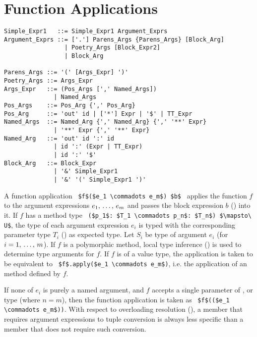\section{Function Applications}
\label{sec:function-applications}

\syntax\begin{lstlisting}[mathescape=false]
Simple_Expr1   ::= Simple_Expr1 Argument_Exprs 
Argument_Exprs ::= ['.'] Parens_Args {Parens_Args} [Block_Arg] 
                 | Poetry_Args [Block_Expr2]
                 | Block_Arg

Parens_Args ::= '(' [Args_Expr] ')'
Poetry_Args ::= Args_Expr
Args_Expr   ::= (Pos_Args [',' Named_Args])
              | Named_Args
Pos_Args    ::= Pos_Arg {',' Pos_Arg}
Pos_Arg     ::= 'out' id | ['*'] Expr | '$' | TT_Expr
Named_Args  ::= Named_Arg {',' Named_Arg} {',' '**' Expr}
              | '**' Expr {',' '**' Expr}
Named_Arg   ::= 'out' id ':' id
              | id ':' (Expr | TT_Expr)
              | id ':' '$'
Block_Arg   ::= Block_Expr 
              | '&' Simple_Expr1 
              | '&' '(' Simple_Expr1 ')'
\end{lstlisting}


A function application ~\lstinline!$f$($e_1 \commadots e_m$) $b$!~ applies the function $f$ to the argument expressions $e_1 ,\, \ldots ,\, e_m$ and passes the block expression $b$ () into it. If $f$ has a method type ~\lstinline!($p_1$: $T_1 \commadots p_n$: $T_n$) $\mapsto\ U$!, the type of each argument expression $e_i$ is typed with the corresponding parameter type $T_i$ () as expected type. Let $S_i$ be type of argument $e_i$ (for $i = 1 ,\, \ldots ,\, m$). If $f$ is a polymorphic method, local type inference () is used to determine type arguments for $f$. If $f$ is of a value type, the application is taken to be equivalent to ~\lstinline!$f$.apply($e_1 \commadots e_m$)!, i.e. the application of an  method defined by $f$. 

If none of $e_i$ is purely a named argument, and $f$ accepts a single parameter of ,  or  type (where $n = m$), then the function application is taken as ~\lstinline!$f$(($e_1 \commadots e_m$))!. With respect to overloading resolution (), a member that requires argument expressions to tuple conversion is always less specific than a member that does not require such conversion. 





